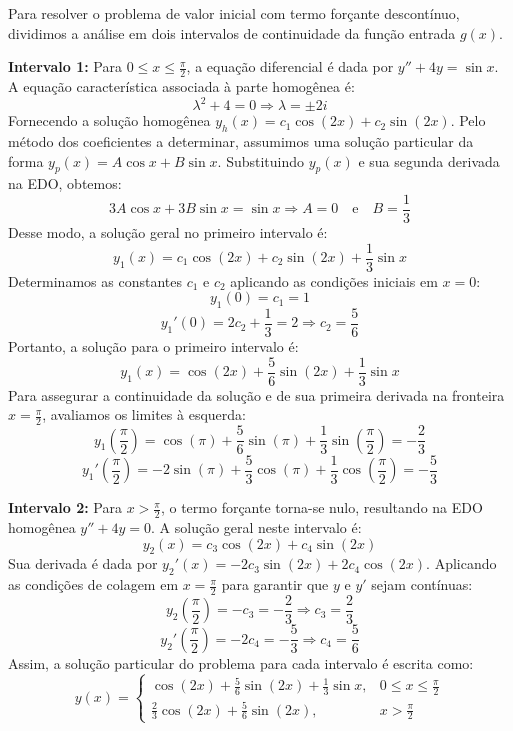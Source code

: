 \documentclass[oneside,12pt,a4paper]{report}
\begin{document}
\begin{resolucao}
    Para resolver o problema de valor inicial com termo forçante descontínuo, dividimos a análise em dois intervalos de continuidade da função entrada $g(x)$.

    \textbf{Intervalo 1:} Para $0 \leq x \leq \frac{\pi}{2}$, a equação diferencial é dada por $y'' + 4y = \sin x$. 
    A equação característica associada à parte homogênea é:
    \[\lambda^2 + 4 = 0 \Rightarrow \lambda = \pm 2i\]
    Fornecendo a solução homogênea $y_h(x) = c_1 \cos(2x) + c_2 \sin(2x)$. Pelo método dos coeficientes a determinar, assumimos uma solução particular da forma $y_p(x) = A \cos x + B \sin x$. Substituindo $y_p(x)$ e sua segunda derivada na EDO, obtemos:
    \[3A \cos x + 3B \sin x = \sin x \Rightarrow A = 0 \quad \text{e} \quad B = \frac{1}{3}\]
    Desse modo, a solução geral no primeiro intervalo é:
    \[y_1(x) = c_1 \cos(2x) + c_2 \sin(2x) + \frac{1}{3} \sin x\]
    Determinamos as constantes $c_1$ e $c_2$ aplicando as condições iniciais em $x = 0$:
    \[y_1(0) = c_1 = 1\]
    \[y_1'(0) = 2c_2 + \frac{1}{3} = 2 \Rightarrow c_2 = \frac{5}{6}\]
    Portanto, a solução para o primeiro intervalo é:
    \[y_1(x) = \cos(2x) + \frac{5}{6} \sin(2x) + \frac{1}{3} \sin x\]
    Para assegurar a continuidade da solução e de sua primeira derivada na fronteira $x = \frac{\pi}{2}$, avaliamos os limites à esquerda:
    \[y_1\left(\frac{\pi}{2}\right) = \cos(\pi) + \frac{5}{6}\sin(\pi) + \frac{1}{3}\sin\left(\frac{\pi}{2}\right) = -\frac{2}{3}\]
    \[y_1'\left(\frac{\pi}{2}\right) = -2\sin(\pi) + \frac{5}{3}\cos(\pi) + \frac{1}{3}\cos\left(\frac{\pi}{2}\right) = -\frac{5}{3}\]

    \textbf{Intervalo 2:} Para $x > \frac{\pi}{2}$, o termo forçante torna-se nulo, resultando na EDO homogênea $y'' + 4y = 0$. A solução geral neste intervalo é:
    \[y_2(x) = c_3 \cos(2x) + c_4 \sin(2x)\]
    Sua derivada é dada por $y_2'(x) = -2c_3 \sin(2x) + 2c_4 \cos(2x)$. Aplicando as condições de colagem em $x = \frac{\pi}{2}$ para garantir que $y$ e $y'$ sejam contínuas:
    \[y_2\left(\frac{\pi}{2}\right) = -c_3 = -\frac{2}{3} \Rightarrow c_3 = \frac{2}{3}\]
    \[y_2'\left(\frac{\pi}{2}\right) = -2c_4 = -\frac{5}{3} \Rightarrow c_4 = \frac{5}{6}\]
    Assim, a solução particular do problema para cada intervalo é escrita como:
    \[\boxed{y(x) = \begin{cases} \cos(2x) + \frac{5}{6} \sin(2x) + \frac{1}{3} \sin x, & 0 \leq x \leq \frac{\pi}{2} \\ \frac{2}{3} \cos(2x) + \frac{5}{6} \sin(2x), & x > \frac{\pi}{2} \end{cases}}\]
\end{resolucao}
\end{document}
